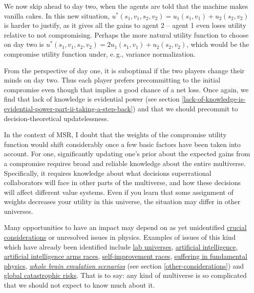 We now skip ahead to day two, when the agents are told that the machine
makes vanilla cakes. In this new situation,
\(u^{*}(s_{1},v_{1},s_{2},v_{2}) = u_{1}(s_{1},v_{1}) + u_{2}(s_{2},v_{2})\)
is harder to justify, as it gives all the gains to agent 2 -- agent 1
even loses utility relative to not compromising. Perhaps the more
natural utility function to choose on day two is
\(u^{*}(s_{1},v_{1},s_{2},v_{2}) = {2u}_{1}(s_{1},v_{1}) + u_{2}(s_{2},v_{2})\),
which would be the compromise utility function under, e.\,g., variance
normalization.

From the perspective of day one, it is suboptimal if the two players
change their minds on day two. Thus each player prefers precommitting to
the initial compromise even though that implies a good chance of a net
loss. Once again, we find that lack of knowledge is evidential power
(see section
\ref{lack-of-knowledge-is-evidential-power-part-ii-taking-a-step-back}) and
that we should precommit to decision-theoretical updatelessness.

In the context of MSR, I doubt that the weights of the compromise
utility function would shift considerably once a few basic factors have
been taken into account. For one, significantly updating one's prior
about the expected gains from a compromise requires broad and reliable
knowledge about the entire multiverse. Specifically, it requires
knowledge about what decisions superrational collaborators will face in
other parts of the multiverse, and how these decisions will affect
different value systems. Even if you learn that some assignment of
weights decreases your utility in this universe, the situation may
differ in other universes.

Many opportunities to have an impact may depend on as yet unidentified
\href{https://casparoesterheld.files.wordpress.com/2016/11/crucialconsiderations1.pdf}{crucial
considerations} or unresolved issues in physics. Examples of issues of
this kind which have already been identified include
\href{http://reducing-suffering.org/lab-universes-creating-infinite-suffering/}{lab
universes},
\href{https://foundational-research.org/why-altruists-should-focus-on-artificial-intelligence/}{artificial
intelligence},
\href{https://wiki.lesswrong.com/wiki/AI_arms_race}{artificial
intelligence arms races},
\href{https://casparoesterheld.com/2016/07/04/self-improvement-races/}{self-improvement
races},
\href{http://reducing-suffering.org/is-there-suffering-in-fundamental-physics/}{suffering
in fundamental physics}, \protect\hyperlink{_v01fa6ipo6d7}{\emph{whole
brain emulation scenarios}} (see section
\ref{other-considerations}) and
\href{https://en.wikipedia.org/wiki/Global_catastrophic_risk}{global
catastrophic risks}. That is to say: any kind of multiverse is so
complicated that we should not expect to know much about it.

